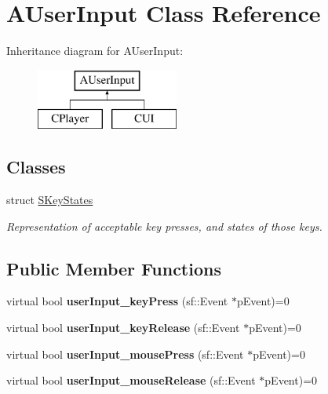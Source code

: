 \hypertarget{classAUserInput}{\section{A\-User\-Input Class Reference}
\label{classAUserInput}
}
Inheritance diagram for A\-User\-Input\-:\begin{figure}[H]
\begin{center}
\leavevmode
\includegraphics[height=2.000000cm]{classAUserInput}
\end{center}
\end{figure}
\subsection*{Classes}
\begin{DoxyCompactItemize}
\item 
struct \hyperlink{structAUserInput_1_1SKeyStates}{S\-Key\-States}
\begin{DoxyCompactList}\small\item\em Representation of acceptable key presses, and states of those keys. \end{DoxyCompactList}\end{DoxyCompactItemize}
\subsection*{Public Member Functions}
\begin{DoxyCompactItemize}
\item 
\hypertarget{classAUserInput_a110239bcc0461666583d1dc940cb5d13}{virtual bool {\bfseries user\-Input\-\_\-key\-Press} (sf\-::\-Event $\ast$p\-Event)=0}\label{classAUserInput_a110239bcc0461666583d1dc940cb5d13}

\item 
\hypertarget{classAUserInput_afe8ae22fff673d788e366b9b29ffa67d}{virtual bool {\bfseries user\-Input\-\_\-key\-Release} (sf\-::\-Event $\ast$p\-Event)=0}\label{classAUserInput_afe8ae22fff673d788e366b9b29ffa67d}

\item 
\hypertarget{classAUserInput_a567e0d0610bd2ef2e23fed64b3e56d2b}{virtual bool {\bfseries user\-Input\-\_\-mouse\-Press} (sf\-::\-Event $\ast$p\-Event)=0}\label{classAUserInput_a567e0d0610bd2ef2e23fed64b3e56d2b}

\item 
\hypertarget{classAUserInput_a570f71dde4825c3e9bdcf6b58857f514}{virtual bool {\bfseries user\-Input\-\_\-mouse\-Release} (sf\-::\-Event $\ast$p\-Event)=0}\label{classAUserInput_a570f71dde4825c3e9bdcf6b58857f514}

\end{DoxyCompactItemize}
